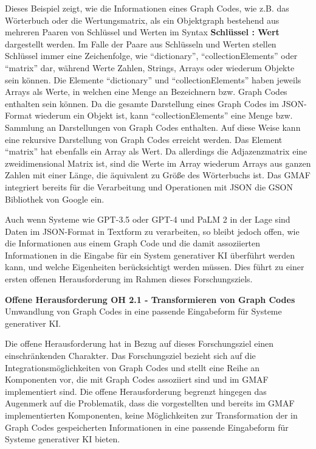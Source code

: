 Dieses Beispiel zeigt, wie die Informationen eines Graph Codes, wie z.B. das Wörterbuch oder die Wertungsmatrix, als ein Objektgraph bestehend aus mehreren Paaren von Schlüssel und Werten im Syntax \textbf{Schlüssel : Wert} dargestellt werden.
Im Falle der Paare aus Schlüsseln und Werten stellen Schlüssel immer eine Zeichenfolge, wie \enquote{dictionary}, \enquote{collectionElements} oder \enquote{matrix} dar, während Werte Zahlen, Strings, Arrays oder wiederum Objekte sein können.
Die Elemente \enquote{dictionary} und \enquote{collectionElements} haben jeweils Arrays als Werte, in welchen eine Menge an Bezeichnern bzw. Graph Codes enthalten sein können.
Da die gesamte Darstellung eines Graph Codes im JSON-Format wiederum ein Objekt ist, kann \enquote{collectionElements} eine Menge bzw. Sammlung an Darstellungen von Graph Codes enthalten.
Auf diese Weise kann eine rekursive Darstellung von Graph Codes erreicht werden.
Das Element \enquote{matrix} hat ebenfalls ein Array als Wert.
Da allerdings die Adjazenzmatrix eine zweidimensional Matrix ist, sind die Werte im Array wiederum Arrays aus ganzen Zahlen mit einer Länge, die äquivalent zu Größe des Wörterbuchs ist.
Das GMAF integriert bereits für die Verarbeitung und Operationen mit JSON die GSON \cite{gson} Bibliothek von Google ein.

Auch wenn Systeme wie GPT-3.5 oder GPT-4 und PaLM 2 in der Lage sind Daten im JSON-Format in Textform zu verarbeiten, so bleibt jedoch offen, wie die Informationen aus einem Graph Code und die damit assoziierten Informationen in die Eingabe für ein System generativer KI überführt werden kann, und welche Eigenheiten berücksichtigt werden müssen.
Dies führt zu einer ersten offenen Herausforderung im Rahmen dieses Forschungsziels.
\begin{tcolorbox}[minipage, colback=white, colframe=black, arc=0pt, outer arc=0pt]
    \textbf{Offene Herausforderung OH 2.1 - Transformieren von Graph Codes} \\
    Umwandlung von Graph Codes in eine passende Eingabeform für Systeme generativer KI.
\end{tcolorbox}

Die offene Herausforderung  hat in Bezug auf dieses Forschungsziel einen einschränkenden Charakter.
Das Forschungsziel bezieht sich auf die Integrationsmöglichkeiten von Graph Codes und stellt eine Reihe an Komponenten vor, die mit Graph Codes assoziiert sind und im GMAF implementiert sind.
Die offene Herausforderung begrenzt hingegen das Augenmerk auf die Problematik, dass die vorgestellten und bereits im GMAF implementierten Komponenten, keine Möglichkeiten zur Transformation der in Graph Codes gespeicherten Informationen in eine passende Eingabeform für Systeme generativer KI bieten.

